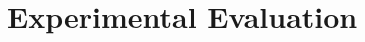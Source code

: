 \documentclass[10pt,aspectratio=169]{beamer}
\begin{document}
\section{Experimental Evaluation}
%
%
\end{document}

